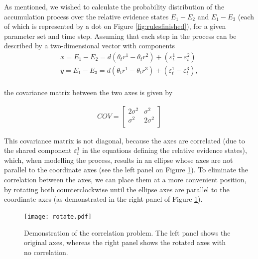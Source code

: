 \documentclass[11pt,a4paper]{article}
\begin{document}
As mentioned, we wished to calculate the probability distribution of the accumulation process over the relative evidence states $E_{1}-E_{2}$ and $E_{1}-E_{3}$ (each of which is represented by a dot on Figure \ref{fig:rulesfinished}), for a given parameter set and time step. Assuming that each step in the process can be described by a two-dimensional vector with components
\begin{equation}
\begin{array}{l}
\displaystyle x = E_{1}-E_{2} = d(\theta_{t}r^1-\theta_{t}r^2) + (\varepsilon_{t}^{1}-\varepsilon_{t}^{2})\\
\displaystyle y = E_{1}-E_{3} = d(\theta_{t}r^1-\theta_{t}r^3) + (\varepsilon_{t}^{1}-\varepsilon_{t}^{3}),\\
\end{array} 
\label{eq:axes1}
\end{equation}

the covariance matrix between the two axes is given by

\begin{equation}
\begin{array}{l}
COV = \begin{bmatrix}
       2\sigma^2 & \sigma^2 \\[0.3em]
       \sigma^2 & 2\sigma^2 \\[0.3em]
     \end{bmatrix}
\end{array} 
\label{eq:covariance}
\end{equation}

This covariance matrix is not diagonal, because the axes are correlated (due to the shared component $\varepsilon_{t}^{1}$ in the equations defining the relative evidence states), which, when modelling the process, results in an ellipse whose axes are not parallel to the coordinate axes (see the left panel on Figure \ref{fig:rotate}).  To eliminate the correlation between the axes, we can place them at a more convenient position, by rotating both counterclockwise until the ellipse axes are parallel to the coordinate axes (as demonstrated in the right panel of Figure \ref{fig:rotate}). 

\begin{figure}[htp!]
\captionsetup{justification=centering}
\centering
\caption{Demonstration of the correlation problem. The left panel shows the original axes, whereas the right panel shows the rotated axes with no correlation.}
\texttt{[image: rotate.pdf]}
\label{fig:rotate}
\end{figure}
 
\end{document}
